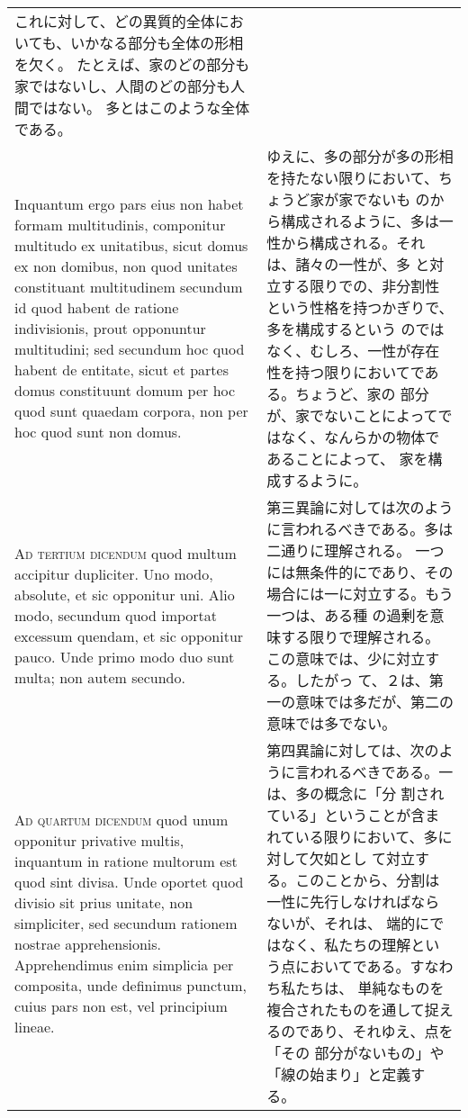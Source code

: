 \documentclass[10pt]{jsarticle} %
\begin{document}
\begin{longtable}{p{21em}p{21em}}
これに対して、どの異質的全体においても、いかなる部分も全体の形相を欠く。
たとえば、家のどの部分も家ではないし、人間のどの部分も人間ではない。
多とはこのような全体である。

\\

Inquantum ergo pars eius non habet formam multitudinis, componitur
multitudo ex unitatibus, sicut domus ex non domibus, non quod unitates
constituant multitudinem secundum id quod habent de ratione
indivisionis, prout opponuntur multitudini; sed secundum hoc quod
habent de entitate, sicut et partes domus constituunt domum per hoc
quod sunt quaedam corpora, non per hoc quod sunt non domus.

&

ゆえに、多の部分が多の形相を持たない限りにおいて、ちょうど家が家でないも
のから構成されるように、多は一性から構成される。それは、諸々の一性が、多
と対立する限りでの、非分割性という性格を持つかぎりで、多を構成するという
のではなく、むしろ、一性が存在性を持つ限りにおいてである。ちょうど、家の
部分が、家でないことによってではなく、なんらかの物体であることによって、
家を構成するように。

\\

{\scshape Ad tertium dicendum} quod multum accipitur dupliciter. Uno modo,
absolute, et sic opponitur uni. Alio modo, secundum quod importat
excessum quendam, et sic opponitur pauco. Unde primo modo duo sunt
multa; non autem secundo.

&

第三異論に対しては次のように言われるべきである。多は二通りに理解される。
一つには無条件的にであり、その場合には一に対立する。もう一つは、ある種
の過剰を意味する限りで理解される。この意味では、少に対立する。したがっ
て、２は、第一の意味では多だが、第二の意味では多でない。

\\

{\scshape Ad quartum dicendum} quod unum opponitur privative multis,
inquantum in ratione multorum est quod sint divisa. Unde oportet quod
divisio sit prius unitate, non simpliciter, sed secundum rationem
nostrae apprehensionis. Apprehendimus enim simplicia per composita, unde
definimus punctum, cuius pars non est, vel principium lineae. 

&

第四異論に対しては、次のように言われるべきである。一は、多の概念に「分
割されている」ということが含まれている限りにおいて、多に対して欠如とし
て対立する。このことから、分割は一性に先行しなければならないが、それは、
端的にではなく、私たちの理解という点においてである。すなわち私たちは、
単純なものを複合されたものを通して捉えるのであり、それゆえ、点を「その
部分がないもの」や「線の始まり」と定義する。


\end{longtable}
\end{document}
